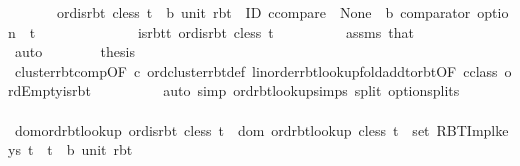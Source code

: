 \begin{isabellebody}
\ \ \ \ \ \ \ {\isachardoublequoteopen}ord{\isachardot}{\kern0pt}is{\isacharunderscore}{\kern0pt}rbt\ cless\ {\isacharparenleft}{\kern0pt}t\ {\isacharcolon}{\kern0pt}{\isacharcolon}{\kern0pt}\ {\isacharparenleft}{\kern0pt}{\isacharprime}{\kern0pt}b{\isacharcomma}{\kern0pt}\ unit{\isacharparenright}{\kern0pt}\ rbt{\isacharparenright}{\kern0pt}\ {\isasymor}\ ID\ ccompare\ {\isacharequal}{\kern0pt}\ {\isacharparenleft}{\kern0pt}None\ {\isacharcolon}{\kern0pt}{\isacharcolon}{\kern0pt}\ {\isacharprime}{\kern0pt}b\ comparator\ option{\isacharparenright}{\kern0pt}{\isachardoublequoteclose}\ \ t\isanewline
\ \ \ \ \isamarkupfalse%
\ {\isacharminus}{\kern0pt}\isanewline
\ \ \ \ \ \ \isamarkupfalse%
\ is{\isacharunderscore}{\kern0pt}rbt{\isacharunderscore}{\kern0pt}t{\isacharcolon}{\kern0pt}\ {\isachardoublequoteopen}ord{\isachardot}{\kern0pt}is{\isacharunderscore}{\kern0pt}rbt\ cless\ t{\isachardoublequoteclose}\isanewline
\ \ \ \ \ \ \ \ \isamarkupfalse%
\ assms\ that\isanewline
\ \ \ \ \ \ \ \ \isamarkupfalse%
\ auto\isanewline
\ \ \ \ \ \ \isamarkupfalse%
\ {\isacharquery}{\kern0pt}thesis\isanewline
\ \ \ \ \ \ \ \ \isamarkupfalse%
\ cluster{\isacharunderscore}{\kern0pt}rbt{\isacharunderscore}{\kern0pt}comp{\isacharbrackleft}{\kern0pt}OF\ c{\isacharbrackright}{\kern0pt}\ ord{\isachardot}{\kern0pt}cluster{\isacharunderscore}{\kern0pt}rbt{\isacharunderscore}{\kern0pt}def\ linorder{\isachardot}{\kern0pt}rbt{\isacharunderscore}{\kern0pt}lookup{\isacharunderscore}{\kern0pt}fold{\isacharunderscore}{\kern0pt}add{\isacharunderscore}{\kern0pt}to{\isacharunderscore}{\kern0pt}rbt{\isacharbrackleft}{\kern0pt}OF\ c{\isacharunderscore}{\kern0pt}class\ ord{\isachardot}{\kern0pt}Empty{\isacharunderscore}{\kern0pt}is{\isacharunderscore}{\kern0pt}rbt{\isacharbrackright}{\kern0pt}\isanewline
\ \ \ \ \ \ \ \ \isamarkupfalse%
\ {\isacharparenleft}{\kern0pt}auto\ simp{\isacharcolon}{\kern0pt}\ ord{\isachardot}{\kern0pt}rbt{\isacharunderscore}{\kern0pt}lookup{\isachardot}{\kern0pt}simps\ split{\isacharcolon}{\kern0pt}\ option{\isachardot}{\kern0pt}splits{\isacharparenright}{\kern0pt}\isanewline
\ \ \ \ \isamarkupfalse%
\isanewline
\ \ \ \ \isamarkupfalse%
\ dom{\isacharunderscore}{\kern0pt}ord{\isacharunderscore}{\kern0pt}rbt{\isacharunderscore}{\kern0pt}lookup{\isacharcolon}{\kern0pt}\ {\isachardoublequoteopen}ord{\isachardot}{\kern0pt}is{\isacharunderscore}{\kern0pt}rbt\ cless\ t\ {\isasymLongrightarrow}\ dom\ {\isacharparenleft}{\kern0pt}ord{\isachardot}{\kern0pt}rbt{\isacharunderscore}{\kern0pt}lookup\ cless\ t{\isacharparenright}{\kern0pt}\ {\isacharequal}{\kern0pt}\ set\ {\isacharparenleft}{\kern0pt}RBT{\isacharunderscore}{\kern0pt}Impl{\isachardot}{\kern0pt}keys\ t{\isacharparenright}{\kern0pt}{\isachardoublequoteclose}\ \ t\ {\isacharcolon}{\kern0pt}{\isacharcolon}{\kern0pt}\ {\isachardoublequoteopen}{\isacharparenleft}{\kern0pt}{\isacharprime}{\kern0pt}b{\isacharcomma}{\kern0pt}\ unit{\isacharparenright}{\kern0pt}\ rbt{\isachardoublequoteclose}\isanewline

\end{isabellebody}

